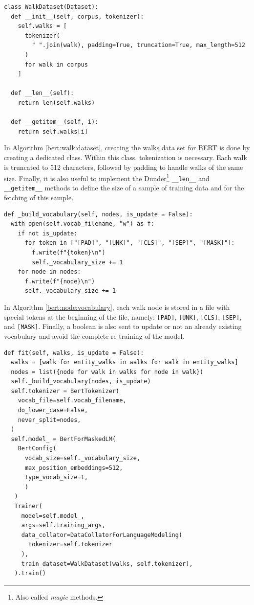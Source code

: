 \begin{lstlisting}[caption=Creation of the Walk Data Set.,label=bert:walk:dataset]
class WalkDataset(Dataset):
  def __init__(self, corpus, tokenizer):
    self.walks = [
      tokenizer(
        " ".join(walk), padding=True, truncation=True, max_length=512
      )
      for walk in corpus
    ]

  def __len__(self):
    return len(self.walks)

  def __getitem__(self, i):
    return self.walks[i]
\end{lstlisting}

In Algorithm \ref{bert:walk:dataset}, creating the walks data set for BERT
is done by creating a dedicated class. Within this class, tokenization is necessary.
Each walk is truncated to 512 characters, followed by padding to handle
walks of the same size. Finally, it is also useful to implement the
Dunder\footnote{Also called \emph{magic} methods.}  \texttt{\_\_len\_\_} and
\texttt{\_\_getitem\_\_} methods to define the size of a sample of training data
and for the fetching of this sample.

\begin{lstlisting}[caption=Creation of Node Vocabulary.,label=bert:node:vocabulary]
def _build_vocabulary(self, nodes, is_update = False):
  with open(self.vocab_filename, "w") as f:
    if not is_update:
      for token in ["[PAD]", "[UNK]", "[CLS]", "[SEP]", "[MASK]"]:
        f.write(f"{token}\n")
        self._vocabulary_size += 1
    for node in nodes:
      f.write(f"{node}\n")
      self._vocabulary_size += 1
\end{lstlisting}

In Algorithm \ref{bert:node:vocabulary}, each walk node is stored in a file with
special tokens at the beginning of the file, namely: \texttt{[PAD]},
\texttt{[UNK]}, \texttt{[CLS]}, \texttt{[SEP]}, and \texttt{[MASK]}. Finally, a
boolean is also sent to update or not an already existing vocabulary and avoid
the complete re-training of the model.

\begin{lstlisting}[caption=Fitting the BERT Model According to the Provided Walks.,label=bert:fit]
def fit(self, walks, is_update = False):
  walks = [walk for entity_walks in walks for walk in entity_walks]
  nodes = list({node for walk in walks for node in walk})
  self._build_vocabulary(nodes, is_update)
  self.tokenizer = BertTokenizer(
    vocab_file=self.vocab_filename,
    do_lower_case=False,
    never_split=nodes,
  )
  self.model_ = BertForMaskedLM(
    BertConfig(
      vocab_size=self._vocabulary_size,
      max_position_embeddings=512,
      type_vocab_size=1,
      )
   )
   Trainer(
     model=self.model_,
     args=self.training_args,
     data_collator=DataCollatorForLanguageModeling(
       tokenizer=self.tokenizer
     ),
     train_dataset=WalkDataset(walks, self.tokenizer),
   ).train()
 \end{lstlisting}

